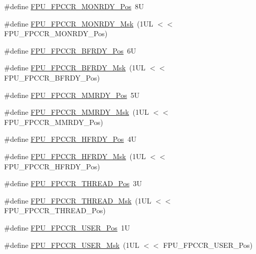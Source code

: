 \begin{DoxyCompactItemize}
\item 
\#define \hyperlink{group___c_m_s_i_s___f_p_u_gae0a4effc79209d821ded517c2be326ba}{F\+P\+U\+\_\+\+F\+P\+C\+C\+R\+\_\+\+M\+O\+N\+R\+D\+Y\+\_\+\+Pos}~8U
\item 
\#define \hyperlink{group___c_m_s_i_s___f_p_u_ga42067729a887081cf56b8fe1029be7a1}{F\+P\+U\+\_\+\+F\+P\+C\+C\+R\+\_\+\+M\+O\+N\+R\+D\+Y\+\_\+\+Msk}~(1\+U\+L $<$$<$ F\+P\+U\+\_\+\+F\+P\+C\+C\+R\+\_\+\+M\+O\+N\+R\+D\+Y\+\_\+\+Pos)
\item 
\#define \hyperlink{group___c_m_s_i_s___f_p_u_ga6d633920f92c3ce4133d769701619b17}{F\+P\+U\+\_\+\+F\+P\+C\+C\+R\+\_\+\+B\+F\+R\+D\+Y\+\_\+\+Pos}~6U
\item 
\#define \hyperlink{group___c_m_s_i_s___f_p_u_gad349eb1323d8399d54a04c0bfd520cb2}{F\+P\+U\+\_\+\+F\+P\+C\+C\+R\+\_\+\+B\+F\+R\+D\+Y\+\_\+\+Msk}~(1\+U\+L $<$$<$ F\+P\+U\+\_\+\+F\+P\+C\+C\+R\+\_\+\+B\+F\+R\+D\+Y\+\_\+\+Pos)
\item 
\#define \hyperlink{group___c_m_s_i_s___f_p_u_gaccdb481211629f9440431439231187f1}{F\+P\+U\+\_\+\+F\+P\+C\+C\+R\+\_\+\+M\+M\+R\+D\+Y\+\_\+\+Pos}~5U
\item 
\#define \hyperlink{group___c_m_s_i_s___f_p_u_gadedfaec9fdd07261573e823a4dcfb5c4}{F\+P\+U\+\_\+\+F\+P\+C\+C\+R\+\_\+\+M\+M\+R\+D\+Y\+\_\+\+Msk}~(1\+U\+L $<$$<$ F\+P\+U\+\_\+\+F\+P\+C\+C\+R\+\_\+\+M\+M\+R\+D\+Y\+\_\+\+Pos)
\item 
\#define \hyperlink{group___c_m_s_i_s___f_p_u_gab12733991487acc2da41ca300fe36fb6}{F\+P\+U\+\_\+\+F\+P\+C\+C\+R\+\_\+\+H\+F\+R\+D\+Y\+\_\+\+Pos}~4U
\item 
\#define \hyperlink{group___c_m_s_i_s___f_p_u_gaf4beaa279abff34828344bd594fff8a1}{F\+P\+U\+\_\+\+F\+P\+C\+C\+R\+\_\+\+H\+F\+R\+D\+Y\+\_\+\+Msk}~(1\+U\+L $<$$<$ F\+P\+U\+\_\+\+F\+P\+C\+C\+R\+\_\+\+H\+F\+R\+D\+Y\+\_\+\+Pos)
\item 
\#define \hyperlink{group___c_m_s_i_s___f_p_u_ga0937d64c42374200af44b22e5b49fd26}{F\+P\+U\+\_\+\+F\+P\+C\+C\+R\+\_\+\+T\+H\+R\+E\+A\+D\+\_\+\+Pos}~3U
\item 
\#define \hyperlink{group___c_m_s_i_s___f_p_u_ga8d18cd88336d63d4b1810383aa8da700}{F\+P\+U\+\_\+\+F\+P\+C\+C\+R\+\_\+\+T\+H\+R\+E\+A\+D\+\_\+\+Msk}~(1\+U\+L $<$$<$ F\+P\+U\+\_\+\+F\+P\+C\+C\+R\+\_\+\+T\+H\+R\+E\+A\+D\+\_\+\+Pos)
\item 
\#define \hyperlink{group___c_m_s_i_s___f_p_u_gaea663104375ce6be15470e3db294c92d}{F\+P\+U\+\_\+\+F\+P\+C\+C\+R\+\_\+\+U\+S\+E\+R\+\_\+\+Pos}~1U
\item 
\#define \hyperlink{group___c_m_s_i_s___f_p_u_ga2eb70427eeaa7344196219cf5a8620a4}{F\+P\+U\+\_\+\+F\+P\+C\+C\+R\+\_\+\+U\+S\+E\+R\+\_\+\+Msk}~(1\+U\+L $<$$<$ F\+P\+U\+\_\+\+F\+P\+C\+C\+R\+\_\+\+U\+S\+E\+R\+\_\+\+Pos)

\end{DoxyCompactItemize}
